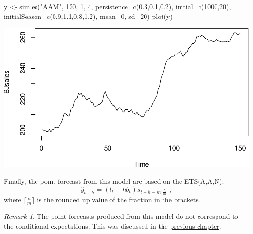 \documentclass[
]{book}
\newenvironment{Shaded}{\begin{snugshade}}{\end{snugshade}}
\newcommand{\AttributeTok}[1]{\textcolor[rgb]{0.77,0.63,0.00}{#1}}
\newcommand{\DecValTok}[1]{\textcolor[rgb]{0.00,0.00,0.81}{#1}}
\newcommand{\FloatTok}[1]{\textcolor[rgb]{0.00,0.00,0.81}{#1}}
\newcommand{\FunctionTok}[1]{\textcolor[rgb]{0.00,0.00,0.00}{#1}}
\newcommand{\NormalTok}[1]{#1}
\newcommand{\OtherTok}[1]{\textcolor[rgb]{0.56,0.35,0.01}{#1}}
\newcommand{\StringTok}[1]{\textcolor[rgb]{0.31,0.60,0.02}{#1}}
\theoremstyle{definition}
\theoremstyle{definition}
\theoremstyle{definition}
\theoremstyle{definition}
\theoremstyle{remark}
\newtheorem*{remark}{Remark}
\begin{document}
\begin{Shaded}
\begin{Highlighting}[]
\NormalTok{y }\OtherTok{\textless{}{-}} \FunctionTok{sim.es}\NormalTok{(}\StringTok{"AAM"}\NormalTok{, }\DecValTok{120}\NormalTok{, }\DecValTok{1}\NormalTok{, }\DecValTok{4}\NormalTok{, }\AttributeTok{persistence=}\FunctionTok{c}\NormalTok{(}\FloatTok{0.3}\NormalTok{,}\FloatTok{0.1}\NormalTok{,}\FloatTok{0.2}\NormalTok{),}
            \AttributeTok{initial=}\FunctionTok{c}\NormalTok{(}\DecValTok{1000}\NormalTok{,}\DecValTok{20}\NormalTok{), }\AttributeTok{initialSeason=}\FunctionTok{c}\NormalTok{(}\FloatTok{0.9}\NormalTok{,}\FloatTok{1.1}\NormalTok{,}\FloatTok{0.8}\NormalTok{,}\FloatTok{1.2}\NormalTok{),}
            \AttributeTok{mean=}\DecValTok{0}\NormalTok{, }\AttributeTok{sd=}\DecValTok{20}\NormalTok{)}
\FunctionTok{plot}\NormalTok{(y)}
\end{Highlighting}
\end{Shaded}

\includegraphics{adam_files/figure-latex/unnamed-chunk-29-1.pdf}

Finally, the point forecast from this model are based on the ETS(A,A,N):
\begin{equation}
    \hat{y}_{t+h} = (l_{t} + h b_t) s_{t+h-m\lceil\frac{h}{m}\rceil},
  \label{eq:ETSAANForecast}
\end{equation}
where \(\lceil\frac{h}{m}\rceil\) is the rounded up value of the fraction in the brackets.

\begin{remark}

The point forecasts produced from this model do not correspond to the conditional expectations. This was discussed in the \protect\hyperlink{ETSTaxonomyMaths}{previous chapter}.

\end{remark}
\end{document}
